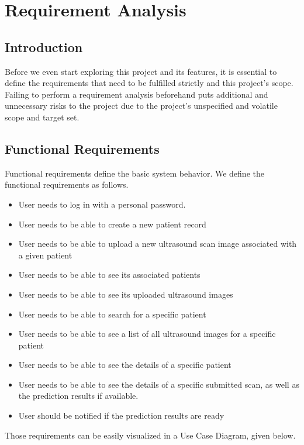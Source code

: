 \chapter{Requirement Analysis}
	
	\section{Introduction}
		Before we even start exploring this project and its features, it is essential to define the requirements that need to be 
		fulfilled strictly and this project's scope. Failing to perform a requirement analysis beforehand puts additional and unnecessary 
		risks to the project due to the project's unspecified and volatile scope and target set.
	\section{Functional Requirements}
		Functional requirements define the basic system behavior. We define the functional requirements as follows.
			\begin{itemize}
				\item User needs to log in with a personal password.
				\item User needs to be able to create a new patient record
				\item User needs to be able to upload a new ultrasound scan image associated with a given patient
				\item User needs to be able to see its associated patients
				\item User needs to be able to see its uploaded ultrasound images
				\item User needs to be able to search for a specific patient
				\item User needs to be able to see a list of all ultrasound images for a specific patient
				\item User needs to be able to see the details of a specific patient
				\item User needs to be able to see the details of a specific submitted scan, as well as the prediction results if available.
				\item User should be notified if the prediction results are ready	
			\end{itemize}
			Those requirements can be easily visualized in a Use Case Diagram, given below.
